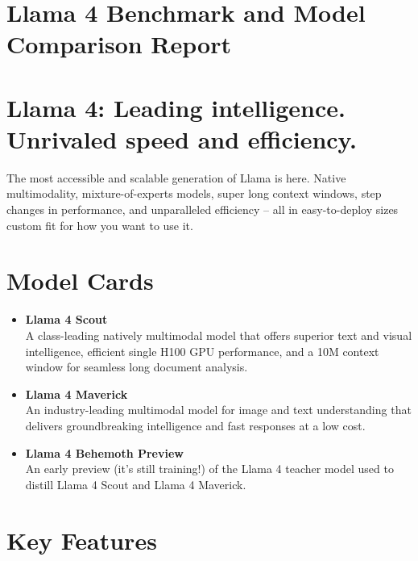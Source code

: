 \documentclass{article}
\begin{document}
\section*{Llama 4 Benchmark and Model Comparison Report}

\bigskip

\section*{Llama 4: Leading intelligence. Unrivaled speed and efficiency.}

The most accessible and scalable generation of Llama is here. Native multimodality, mixture-of-experts models, super long context windows, step changes in performance, and unparalleled efficiency – all in easy-to-deploy sizes custom fit for how you want to use it.

\bigskip

\section*{Model Cards}

\begin{itemize}
    \item \textbf{Llama 4 Scout} \\
          A class-leading natively multimodal model that offers superior text and visual intelligence, efficient single H100 GPU performance, and a 10M context window for seamless long document analysis.

    \item \textbf{Llama 4 Maverick} \\
          An industry-leading multimodal model for image and text understanding that delivers groundbreaking intelligence and fast responses at a low cost.

    \item \textbf{Llama 4 Behemoth Preview} \\
          An early preview (it’s still training!) of the Llama 4 teacher model used to distill Llama 4 Scout and Llama 4 Maverick.
\end{itemize}

\bigskip

\section*{Key Features}
\end{document}
